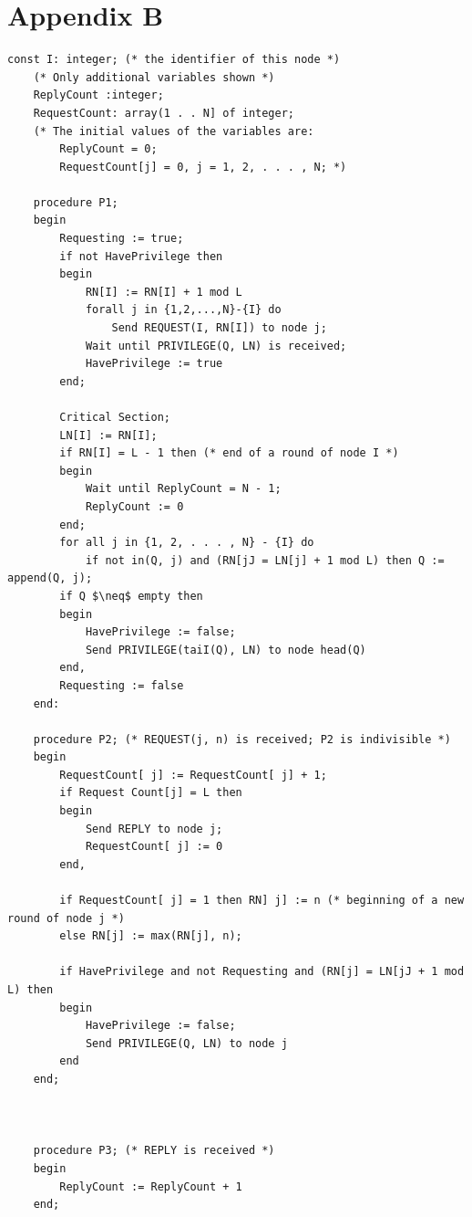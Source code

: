 \documentclass[a4paper,10pt]{llncs}
\begin{document}
\section{Appendix B}
\label{sec:skam}

\begin{lstlisting}[label=some-code,caption=Suzuki and Kasami's modified algorithm,mathescape]
const I: integer; (* the identifier of this node *)
	(* Only additional variables shown *)
	ReplyCount :integer;
	RequestCount: array(1 . . N] of integer;
	(* The initial values of the variables are:
		ReplyCount = 0;
		RequestCount[j] = 0, j = 1, 2, . . . , N; *)

	procedure P1;
	begin
		Requesting := true;
		if not HavePrivilege then
		begin
			RN[I] := RN[I] + 1 mod L
			forall j in {1,2,...,N}-{I} do
				Send REQUEST(I, RN[I]) to node j;
	 		Wait until PRIVILEGE(Q, LN) is received;
			HavePrivilege := true
		end;

		Critical Section;
		LN[I] := RN[I];
		if RN[I] = L - 1 then (* end of a round of node I *)
		begin
			Wait until ReplyCount = N - 1;
			ReplyCount := 0
		end;
		for all j in {1, 2, . . . , N} - {I} do
			if not in(Q, j) and (RN[jJ = LN[j] + 1 mod L) then Q := append(Q, j);
		if Q $\neq$ empty then
		begin
			HavePrivilege := false;
			Send PRIVILEGE(taiI(Q), LN) to node head(Q)
		end,
		Requesting := false
	end:

	procedure P2; (* REQUEST(j, n) is received; P2 is indivisible *)
	begin
		RequestCount[ j] := RequestCount[ j] + 1;
		if Request Count[j] = L then
		begin
			Send REPLY to node j;
			RequestCount[ j] := 0
		end,

		if RequestCount[ j] = 1 then RN] j] := n (* beginning of a new round of node j *)
		else RN[j] := max(RN[j], n);
	
		if HavePrivilege and not Requesting and (RN[j] = LN[jJ + 1 mod L) then
		begin
			HavePrivilege := false;
			Send PRIVILEGE(Q, LN) to node j
		end
	end;



	procedure P3; (* REPLY is received *)
	begin
		ReplyCount := ReplyCount + 1
	end;

\end{lstlisting}
\end{document}
